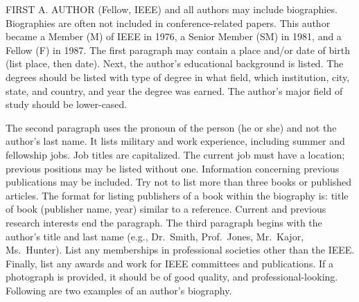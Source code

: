 \documentclass{IEEEoj}
\begin{document}
\begin{IEEEbiography}{FIRST
A. AUTHOR } (Fellow, IEEE) and all authors may include 
biographies. Biographies are often not included in conference-related
papers. This author became a Member (M) of IEEE in 1976, a Senior
Member (SM) in 1981, and a Fellow (F) in 1987. The first paragraph may
contain a place and/or date of birth (list place, then date). Next,
the author's educational background is listed. The degrees should be
listed with type of degree in what field, which institution, city,
state, and country, and year the degree was earned. The author's major
field of study should be lower-cased. 

The second paragraph uses the pronoun of the person (he or she) and not the 
author's last name. It lists military and work experience, including summer 
and fellowship jobs. Job titles are capitalized. The current job must have a 
location; previous positions may be listed 
without one. Information concerning previous publications may be included. 
Try not to list more than three books or published articles. The format for 
listing publishers of a book within the biography is: title of book 
(publisher name, year) similar to a reference. Current and previous research 
interests end the paragraph. The third paragraph begins with the author's 
title and last name (e.g., Dr.\ Smith, Prof.\ Jones, Mr.\ Kajor, Ms.\ Hunter). 
List any memberships in professional societies other than the IEEE. Finally, 
list any awards and work for IEEE committees and publications. If a 
photograph is provided, it should be of good quality, and 
professional-looking. Following are two examples of an author's biography.
\end{IEEEbiography}
\end{document}
